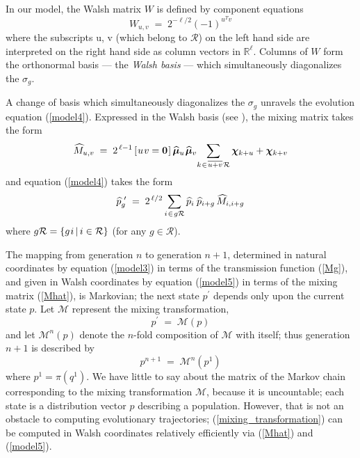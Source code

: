In our model, the Walsh matrix $W$
is defined by component equations
\[
W_{u,v} \; = \; 2^{-\ell/2} (-1)^{u^T v}
\]
where the subscripts \nudge u, \nudge v (which belong to $\mathcal{R}$) on the left hand side are interpreted on the right hand side as column vectors in $\mathbb{R}^{\ell}$.
Columns of $W$ form the orthonormal basis --- the
{\em Walsh basis\/} --- which simultaneously diagonalizes the
$\sigma_g$.

A change of basis which simultaneously diagonalizes the $\sigma_g$
unravels the evolution equation (\ref{model4}).  
Expressed in the Walsh basis (see \cite{VoseWright1998}), the mixing matrix
takes the form
\begin{equation}
\label{Mhat}
\widehat{M}_{u,v} \; = \; 2^{\,\ell-1} \,[\hspace{0.01in} u \hspace{0.01in} v = {\bf
    0}\hspace{0.01in}]\, \widehat{\bm{\mu}}_u \hspace{0.01in} \widehat{\bm{\mu}}_v \!  \sum_{k
  \hspace{0.01in} \in \hspace{0.01in} \overline{u+v} \hspace{0.01in} \mathcal{R}} \bm{\chi}_{k + u} +
\bm{\chi}_{k + v}
\end{equation}
and equation (\ref{model4}) takes the form
\begin{equation}
\label{model5}
\widehat{p}_g^{\,\,\prime} \; = \; 2^{\,\ell/2} \sum_{i \hspace{0.01in} \in \hspace{0.01in} g \mathcal{R}}
\widehat{p}_i \, \hspace{0.01in} \widehat{p}_{i+g} \,\widehat{M}_{i,i+g}
\end{equation}
where $g \mathcal{R} = \{g \hspace{0.01in} i \, | \, i \in \mathcal{R} \}$ (for
any $g \in \mathcal{R}$).

The mapping from generation $n$ to generation $n+1$, determined in
natural coordinates by equation (\ref{model3}) in terms of the
transmission function (\ref{Mg}), and given in Walsh coordinates by
equation (\ref{model5}) in terms of the mixing matrix (\ref{Mhat}), is
Markovian; the next state $p^\prime$ depends only upon the current
state $p$.  Let $\mathcal{M}$ represent the mixing transformation,
\begin{equation} \label{mixing_transformation}
p^\prime \; = \; \mathcal{M}(p)
\end{equation}
and let $\mathcal{M}^n(p)$ denote the $n$-fold composition of
$\mathcal{M}$ with itself; thus generation $n+1$ is described by
\[
p^{n+1} \; = \; \mathcal{M}^n(p^1)
\]
where $p^1 = \pi (q^1)$.  We have little to say
about the matrix of the Markov chain corresponding to the mixing
transformation $\mathcal{M}$, because it is uncountable; each state is
a distribution vector $p$ describing a population. However, that is
not an obstacle to computing evolutionary trajectories;
(\ref{mixing_transformation}) can be computed in Walsh coordinates
relatively efficiently via (\ref{Mhat}) and (\ref{model5}).

